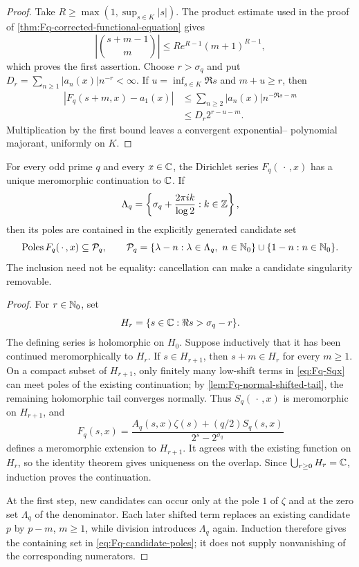 \begin{proof}
Take $R\geq\max(1,\sup_{s\in K}|s|)$.  The product estimate used in the
proof of \cref{thm:Fq-corrected-functional-equation} gives
\[
 \left|\binom{s+m-1}{m}\right|
 \leq Re^{R-1}(m+1)^{R-1},
\]
which proves the first assertion.  Choose $r>\sigma_q$ and put
$D_r=\sum_{n\geq1}|a_n(x)|n^{-r}<\infty$.  If
$u=\inf_{s\in K}\Re s$ and $m+u\geq r$, then
\begin{align*}
 |F_q(s+m,x)-a_1(x)|
 &\leq\sum_{n\geq2}|a_n(x)|n^{-\Re s-m}\\
 &\leq D_r2^{r-u-m}.
\end{align*}
Multiplication by the first bound leaves a convergent exponential--
polynomial majorant, uniformly on $K$.
\end{proof}

\begin{theorem}
\label{thm:Fq-global-meromorphic-continuation}
For every odd prime $q$ and every $x\in\mathbb C$, the Dirichlet series
$F_q(\,\cdot\,,x)$ has a unique meromorphic continuation to $\mathbb C$.
If
\[
 \Lambda_q=\left\{\sigma_q+\frac{2\pi i k}{\log 2}:k\in\mathbb Z\right\},
\]
then its poles are contained in the explicitly generated candidate set
\begin{equation}
 \label{eq:Fq-candidate-poles}
 \operatorname{Poles}F_q(\,\cdot\,,x)\subseteq\mathcal P_q,
 \qquad
 \mathcal P_q=
 \{\lambda-n:\lambda\in\Lambda_q,\ n\in\mathbb N_0\}
 \cup\{1-n:n\in\mathbb N_0\}.
\end{equation}
The inclusion need not be equality: cancellation can make a candidate
singularity removable.
\end{theorem}

\begin{proof}
For $r\in\mathbb N_0$, set
\[
 H_r=\{s\in\mathbb C:\Re s>\sigma_q-r\}.
\]
The defining series is holomorphic on $H_0$.  Suppose inductively that it
has been continued meromorphically to $H_r$.  If $s\in H_{r+1}$, then
$s+m\in H_r$ for every $m\geq1$.  On a compact subset of $H_{r+1}$,
only finitely many low-shift terms in \cref{eq:Fq-Sqx} can meet poles of
the existing continuation; by
\cref{lem:Fq-normal-shifted-tail}, the remaining holomorphic tail
converges normally.  Thus $S_q(\,\cdot\,,x)$ is meromorphic on
$H_{r+1}$, and
\begin{equation}
 \label{eq:Fq-continuation-recursion}
 F_q(s,x)=\frac{A_q(s,x)\zeta(s)+(q/2)S_q(s,x)}
                  {2^s-2^{\sigma_q}}
\end{equation}
defines a meromorphic extension to $H_{r+1}$.  It agrees with the existing
function on $H_r$, so the identity theorem gives uniqueness on the overlap.
Since $\bigcup_{r\geq0}H_r=\mathbb C$, induction proves the continuation.

At the first step, new candidates can occur only at the pole $1$ of
$\zeta$ and at the zero set $\Lambda_q$ of the denominator.  Each later
shifted term replaces an existing candidate $p$ by $p-m$, $m\geq1$,
while division introduces $\Lambda_q$ again.  Induction therefore gives
the containing set in \cref{eq:Fq-candidate-poles}; it does not supply
nonvanishing of the corresponding numerators.
\end{proof}

